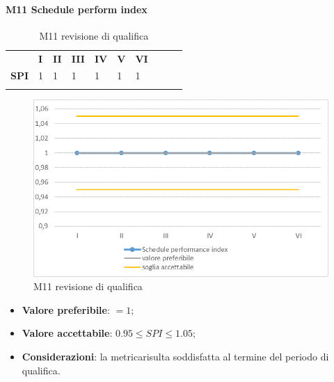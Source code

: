 \paragraph{M11 Schedule perform index} \mbox{}
\begin{longtable}[H!] {						
		>{}p{50mm}  		
		>{}p{8mm}
		>{}p{8mm}		
		>{}p{8mm}		
		>{}p{8mm}		
		>{}p{8mm}		
		>{}p{8mm}
		>{}p{8mm}
		>{}p{8mm}
		>{}p{8mm}
	}
	\rowcolor{gray!50}
	\textbf{} & \textbf{I} & \textbf{II} & \textbf{III} & \textbf{IV} & \textbf{V} & \textbf{VI} \TBstrut \\ [2mm]
	\textbf{SPI} & 1 & 1 & 1 & 1 & 1 & 1 \TBstrut \\ [2mm]
	\rowcolor{white}
	\caption{M11 revisione di qualifica}
\end{longtable}
\begin{figure}[H] 	
	\includegraphics[width=\linewidth]{./img/grafici/RQ11.png}	
	\caption{M11 revisione di qualifica}	
\end{figure}
	\begin{itemize}
		\item \textbf{Valore preferibile}: $=1$;
		\item \textbf{Valore accettabile}: $0.95 \le SPI \le 1.05$;
		\item \textbf{Considerazioni}: la metrica\glosp risulta soddisfatta al termine del periodo di qualifica.
	\end{itemize}

